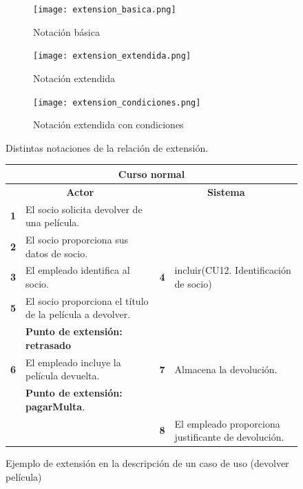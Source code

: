 \documentclass[12pt,spanish]{article}
\begin{document}
\begin{figure}[H]
	\centering
	\begin{subfigure}[b]{0.25\textwidth}
		\texttt{[image: extension\_basica.png]}
		\caption{Notación básica}
	\end{subfigure}
	\quad
	\begin{subfigure}[b]{0.3\textwidth}
		\texttt{[image: extension\_extendida.png]}
		\caption{Notación extendida}
	\end{subfigure}
	\vskip 0.5cm
	\begin{subfigure}[b]{0.5\textwidth}
		\texttt{[image: extension\_condiciones.png]}
		\caption{Notación extendida con condiciones}
	\end{subfigure}
	\caption{Distintas notaciones de la relación de extensión.}
\end{figure}

\begin{figure}[H]
\centering
\begin{tabular}{|m{10pt}|m{7cm}|m{10pt}|m{7cm}|}
\hline
\multicolumn{4}{|c|}{\textbf{Curso normal}} \\
\hline
\multicolumn{2}{|c}{\textbf{Actor}} & \multicolumn{2}{|c|}{\textbf{Sistema}} \\
\hline
\textbf{1} & El socio solicita devolver de una película. &  & \\
\hline
\textbf{2} & El socio proporciona sus datos de socio. &  &  \\
\hline
\textbf{3} & El empleado identifica al socio. & \textbf{4} & incluir(CU12. Identificación de socio) \\
\hline
\textbf{5} & El socio proporciona el título de la película a devolver. &  &  \\
\hline
 & \textbf{Punto de extensión: retrasado} & & \\
 \hline
\textbf{6} & El empleado incluye la película devuelta. & \textbf{7} & Almacena la devolución. \\
\hline
  & \textbf{Punto de extensión: pagarMulta}. & &   \\
\hline
 & & \textbf{8} & El empleado proporciona justificante de devolución.  \\
\hline
\end{tabular}
\caption{Ejemplo de extensión en la descripción de un caso de uso (devolver película)}
\end{figure}
\end{document}
